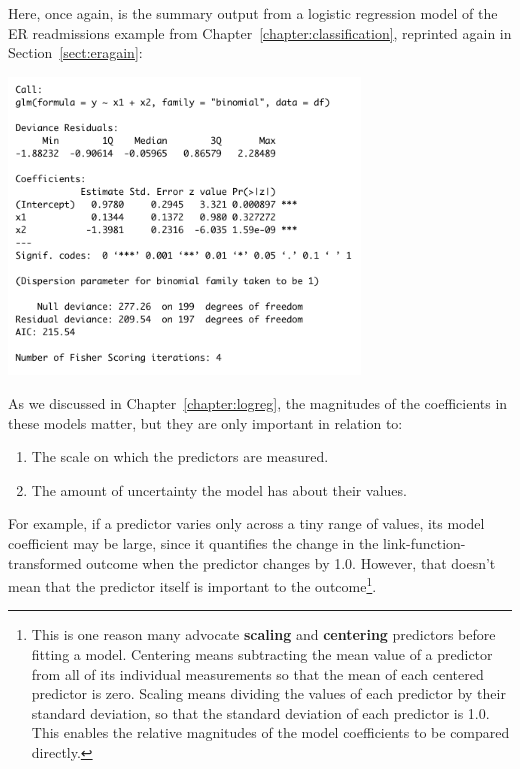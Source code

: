 Here, once again, is the summary output from a logistic regression model of the ER readmissions example from Chapter~\ref{chapter:classification}, reprinted again in Section~\ref{sect:eragain}:
\begin{center}
\includegraphics[width=0.7\textwidth]{img/glm-binomial-example.png}
\end{center}
As we discussed in Chapter~\ref{chapter:logreg}, the magnitudes of the coefficients in these models matter, but they are only important in relation to:
\begin{enumerate}
\item The scale on which the predictors are measured. 
\item The amount of uncertainty the model has about their values.
\end{enumerate}
For example, if a predictor varies only across a tiny range of values, its model coefficient may be large, since it quantifies the change in the link-function-transformed outcome when the predictor changes by 1.0. However, that doesn't mean that the predictor itself is important to the outcome\footnote{This is one reason many advocate \textbf{scaling} and \textbf{centering} predictors before fitting a model. Centering means subtracting the mean value of a predictor from all of its individual measurements so that the mean of each centered predictor is zero. Scaling means dividing the values of each predictor by their standard deviation, so that the standard deviation of each predictor is 1.0. This enables the relative magnitudes of the model coefficients to be compared directly.}.

